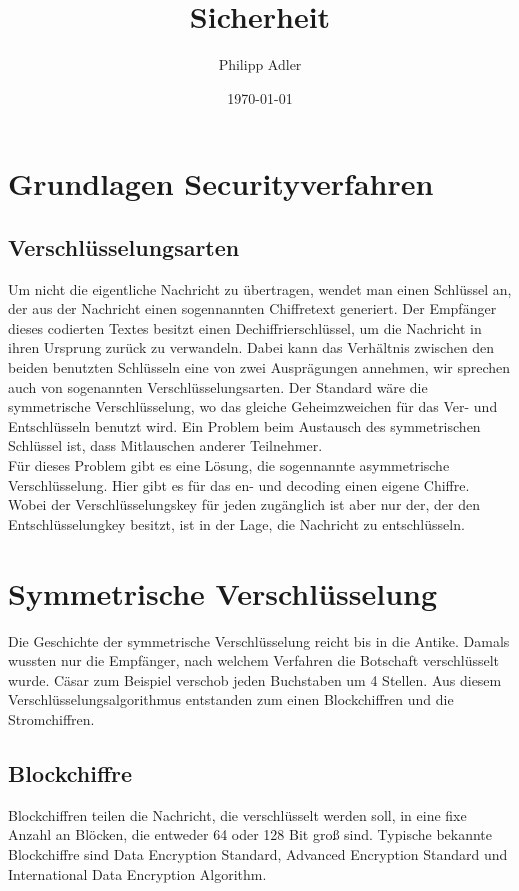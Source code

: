 \documentclass[11pt]{scrartcl}
\title{Sicherheit}
\author{Philipp Adler}
\date{\today{}}
\begin{document}
\maketitle
\pagebreak
\tableofcontents
\pagebreak

\section{Grundlagen Securityverfahren}
\label{sec:basics-security-process}

\subsection{Verschlüsselungsarten}
\label{sec:ciphering types}
Um nicht die eigentliche Nachricht zu übertragen, wendet man einen Schlüssel an, der aus der Nachricht einen sogennannten Chiffretext generiert. Der Empfänger dieses codierten Textes besitzt einen Dechiffrierschlüssel, um die Nachricht in ihren Ursprung zurück zu verwandeln. \grqq{}Dabei kann das Verhältnis zwischen den beiden benutzten Schlüsseln eine von zwei Ausprägungen annehmen, wir sprechen auch von sogenannten Verschlüsselungsarten.\grqq{}\cite{5} Der Standard wäre die symmetrische Verschlüsselung, wo das gleiche Geheimzweichen für das Ver- und Entschlüsseln benutzt wird. Ein Problem beim Austausch des symmetrischen Schlüssel ist, dass Mitlauschen anderer Teilnehmer.\\
Für dieses Problem gibt es eine Lösung, die sogennannte asymmetrische Verschlüsselung. Hier gibt es für das en- und decoding einen eigene Chiffre. Wobei der Verschlüsselungskey für jeden zugänglich ist aber nur der, der den Entschlüsselungkey besitzt, ist in der Lage, die Nachricht zu entschlüsseln. \cite{1}


\section{Symmetrische Verschlüsselung}
\label{sec:symetric-ciphering}
Die Geschichte der symmetrische Verschlüsselung reicht bis in die Antike. Damals wussten nur die Empfänger, nach welchem Verfahren die Botschaft verschlüsselt wurde. Cäsar zum Beispiel verschob jeden Buchstaben um 4 Stellen. Aus diesem Verschlüsselungsalgorithmus entstanden zum einen Blockchiffren und die Stromchiffren. \cite{1}

\subsection{Blockchiffre}
\label{sec:blockchiffre}
Blockchiffren teilen die Nachricht, die verschlüsselt werden soll, in eine fixe Anzahl an Blöcken, die entweder 64 oder 128 Bit groß sind. Typische bekannte Blockchiffre sind Data Encryption Standard, Advanced Encryption Standard und International Data Encryption Algorithm. \cite{1}
\end{document}
